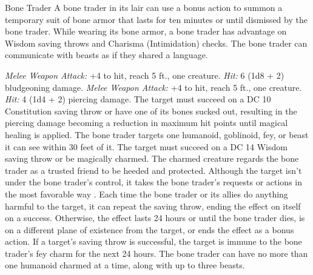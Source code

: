 \documentclass[10pt,a4paper,twoside,twocolumn,openany,bg=print,nodeprecatedcode]{dndbook}
\begin{document}
\clearpage

\begin{DndMonster}[float*=t]{Bone Trader}
\DndMonsterBasics[
armor-class = {12 (15 with bone armor)},
hit-points = {\DndDice{5d8}},
speed = {30 ft.}
]
\DndMonsterAbilityScores[
 str = 10,
 dex = 14,
 con = 11,
 int = 14,
 wis = 15,
 cha = 18
]
\DndMonsterDetails[
saving-throws = {Con +2},
skills = {Animal Handling +4, Perception +4},
senses = {darkvision 60 ft., passive perception 14},
languages = {Sylvan, two other languages},
challenge = 1,
]
A bone trader in its lair can use a bonus action to summon a temporary suit of bone armor that lasts for ten minutes or until dismissed by the bone trader. While wearing its bone armor, a bone trader has advantage on Wisdom saving throws and Charisma (Intimidation) checks.
The bone trader can communicate with beasts as if they shared a language.
\par
{}
\textsl{Melee Weapon Attack:} +4 to hit, reach 5 ft., one creature. \textsl{Hit:} 6 (1d8 + 2) bludgeoning damage.
\textsl{Melee Weapon Attack:} +4 to hit, reach 5 ft., one creature. \textsl{Hit:} 4 (1d4 + 2) piercing damage. The target must succeed on a DC 10 Constitution saving throw or have one of its bones sucked out, resulting in the piercing damage becoming a reduction in maximum hit points until magical healing is applied.
The bone trader targets one humanoid, goblinoid, fey, or beast it can see within 30 feet of it. The target must succeed on a DC 14 Wisdom saving throw or be magically charmed. The charmed creature regards the bone trader as a trusted friend to be heeded and protected. Although the target isn't under the bone trader's control, it takes the bone trader's requests or actions in the most favorable way . Each time the bone trader or its allies do anything harmful to the target, it can repeat the saving throw, ending the effect on itself on a success. Otherwise, the effect lasts 24 hours or until the bone trader dies, is on a different plane of existence from the target, or ends the effect as a bonus action. If a target's saving throw is successful, the target is immune to the bone trader's fey charm for the next 24 hours.
The bone trader can have no more than one humanoid charmed at a time, along with up to three beasts.
\end{DndMonster}
\end{document}
